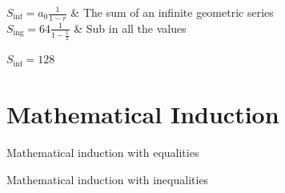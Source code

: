 \documentclass{article}
\begin{document}
    \begin{solns}
        \begin{solnstable}
            $S_{\text{inf}} = a_0\frac{1}{1-r}$ & The sum of an infinite geometric series \\
            $S_{\text{ing}} = 64\frac{1}{1-\frac{1}{2}}$ & Sub in all the values \\
        \end{solnstable}
        \begin{answer}
            $S_{\text{inf}} = 128$
        \end{answer}
    \end{solns}
    \section{Mathematical Induction}
    \begin{knowledge}
        \item Mathematical induction with equalities
        \item Mathematical induction with inequalities
    \end{knowledge}
\end{document}
